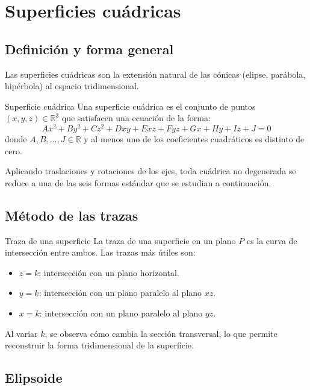 
\section{Superficies cuádricas}

\subsection{Definición y forma general}

Las superficies cuádricas son la extensión natural de las cónicas (elipse, parábola, hipérbola) al espacio tridimensional.

\begin{mydefinition}{Superficie cuádrica}
Una superficie cuádrica es el conjunto de puntos $(x, y, z) \in \mathbb{R}^3$ que satisfacen una ecuación de la forma:
\[
Ax^2 + By^2 + Cz^2 + Dxy + Exz + Fyz + Gx + Hy + Iz + J = 0
\]
donde $A, B, \ldots, J \in \mathbb{R}$ y al menos uno de los coeficientes cuadráticos es distinto de cero.
\end{mydefinition}

Aplicando traslaciones y rotaciones de los ejes, toda cuádrica no degenerada se reduce a una de las seis formas estándar que se estudian a continuación.

\subsection{Método de las trazas}

\begin{mydefinition}{Traza de una superficie}
La traza de una superficie en un plano $P$ es la curva de intersección entre ambos. Las trazas más útiles son:
\begin{itemize}
    \item $z = k$: intersección con un plano horizontal.
    \item $y = k$: intersección con un plano paralelo al plano $xz$.
    \item $x = k$: intersección con un plano paralelo al plano $yz$.
\end{itemize}
Al variar $k$, se observa cómo cambia la sección transversal, lo que permite reconstruir la forma tridimensional de la superficie.
\end{mydefinition}

\subsection{Elipsoide}

